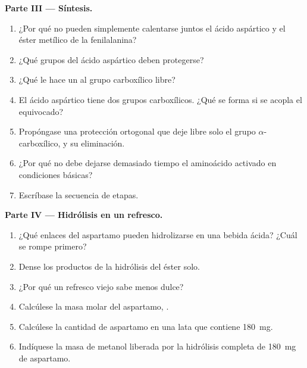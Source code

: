 \begin{problem}
\medskip
\noindent\textbf{Parte III --- Síntesis.}
\begin{enumerate}[resume]
  \item ¿Por qué no pueden simplemente calentarse juntos el ácido aspártico y el éster metílico de la fenilalanina?
  \item ¿Qué grupos del ácido aspártico deben protegerse?
  \item ¿Qué le hace un  al grupo carboxílico libre?
  \item El ácido aspártico tiene dos grupos carboxílicos. ¿Qué se forma si se acopla el equivocado?
  \item Propóngase una protección ortogonal que deje libre solo el grupo $\alpha$-carboxílico, y su
        eliminación.
  \item ¿Por qué no debe dejarse demasiado tiempo el aminoácido activado en condiciones básicas?
  \item Escríbase la secuencia de etapas.
\end{enumerate}

\medskip
\noindent\textbf{Parte IV --- Hidrólisis en un refresco.}
\begin{enumerate}[resume]
  \item ¿Qué enlaces del aspartamo pueden hidrolizarse en una bebida ácida? ¿Cuál se rompe primero?
  \item Dense los productos de la hidrólisis del éster solo.
  \item ¿Por qué un refresco viejo sabe menos dulce?
  \item Calcúlese la masa molar del aspartamo, .
  \item Calcúlese la cantidad de aspartamo en una lata que contiene \qty{180}{mg}.
  \item Indíquese la masa de metanol liberada por la hidrólisis completa de \qty{180}{mg} de
        aspartamo.
\end{enumerate}
\end{problem}
